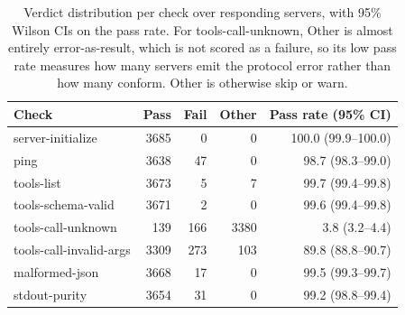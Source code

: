 \begin{table}[t]
\centering
\caption{Verdict distribution per check over responding servers, with 95\% Wilson CIs on the pass rate. For \textsf{tools-call-unknown}, Other is almost entirely error-as-result, which is not scored as a failure, so its low pass rate measures how many servers emit the protocol error rather than how many conform. Other is otherwise skip or warn.}
\label{tab:verdicts}
\begin{tabular}{lrrrr}
\toprule
Check & Pass & Fail & Other & Pass rate (95\% CI) \\
\midrule
server-initialize & 3685 & 0 & 0 & 100.0 (99.9--100.0) \\
ping & 3638 & 47 & 0 & 98.7 (98.3--99.0) \\
tools-list & 3673 & 5 & 7 & 99.7 (99.4--99.8) \\
tools-schema-valid & 3671 & 2 & 0 & 99.6 (99.4--99.8) \\
tools-call-unknown & 139 & 166 & 3380 & 3.8 (3.2--4.4) \\
tools-call-invalid-args & 3309 & 273 & 103 & 89.8 (88.8--90.7) \\
malformed-json & 3668 & 17 & 0 & 99.5 (99.3--99.7) \\
stdout-purity & 3654 & 31 & 0 & 99.2 (98.8--99.4) \\
\bottomrule
\end{tabular}
\end{table}